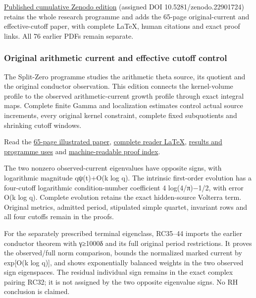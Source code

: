 \documentclass[
]{article}
\begin{document}
\href{https://zenodo.org/records/22901724}{Published cumulative Zenodo
edition} (assigned DOI 10.5281/zenodo.22901724) retains the whole
research programme and adds the 65-page original-current and
effective-cutoff paper, with complete LaTeX, human citations and exact
proof links. All 76 earlier PDFs remain separate.

\subsubsection{Original arithmetic current and effective cutoff
control}\label{original-arithmetic-current-and-effective-cutoff-control}

The Split-Zero programme studies the arithmetic theta source, its
quotient and the original conductor observation. This edition connects
the kernel-volume profile to the observed arithmetic-current growth
profile through exact integral maps. Complete finite Gamma and
localization estimates control actual source increments, every original
kernel constraint, complete fixed subquotients and shrinking cutoff
windows.

Read the
\href{https://github.com/KokunoYumeto/zeta-function-research-reader/blob/main/workbenches/splitzero-tandem/continuations/20260922-current-effective-cutoff/CURRENT_AND_CUTOFF_READER.pdf}{65-page
illustrated paper},
\href{https://github.com/KokunoYumeto/zeta-function-research-reader/blob/main/workbenches/splitzero-tandem/continuations/20260922-current-effective-cutoff/CURRENT_AND_CUTOFF_READER.tex}{complete
reader LaTeX},
\href{https://github.com/KokunoYumeto/zeta-function-research-reader/blob/main/workbenches/splitzero-tandem/continuations/20260922-current-effective-cutoff/RESULTS_20260922_026.md}{results
and programme uses} and
\href{https://github.com/KokunoYumeto/zeta-function-research-reader/blob/main/workbenches/splitzero-tandem/continuations/20260922-current-effective-cutoff/RESULT_INDEX.json}{machine-readable
proof index}.

The two nonzero observed-current eigenvalues have opposite signs, with
logarithmic magnitude qψ(t)+O(k log q). The intrinsic first-order
evolution has a four-cutoff logarithmic condition-number coefficient 4
log(4/π)−1/2, with error O(k log q). Complete evolution retains the
exact hidden-source Volterra term. Original metrics, admitted period,
stipulated simple quartet, invariant rows and all four cutoffs remain in
the proofs.

For the separately prescribed terminal eigenclass, RC35--44 imports the
earlier conductor theorem with γ≥1000δ and its full original period
restrictions. It proves the observed/full norm comparison, bounds the
normalized marked current by exp{[}O(k log q){]}, and shows
exponentially balanced weights in the two observed sign eigenspaces. The
residual individual sign remains in the exact complex pairing RC32; it
is not assigned by the two opposite eigenvalue signs. No RH conclusion
is claimed.
\end{document}
